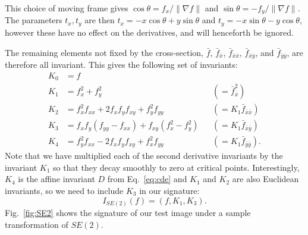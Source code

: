 \documentclass{artjlt}
\begin{document}
This choice of moving frame gives $\cos\theta = f_x/\lVert\nabla f\rVert$
and $\sin\theta = -f_y/\lVert \nabla f \rVert$. The parameters $t_x, t_y$
are then $t_x = -x\cos\theta + y\sin\theta$ and $t_y = -x\sin\theta -
y\cos\theta$, however these have no effect on the derivatives, and will
henceforth be ignored.

The remaining elements not fixed by the cross-section, $\bar{f}$,
$\bar{f}_{\bar{x}}$, $\bar{f}_{\bar{x}\bar{x}}$,
$\bar{f}_{\bar{x}\bar{y}}$, and $\bar{f}_{\bar{y}\bar{y}}$, are therefore
all invariant. This gives the following set of invariants:
\begin{equation}\label{eq:se2invariants}
\begin{aligned}
  K_0 &= f \\
  K_1 &= f_x^2 + f_y^2 & &(= \bar{f}_{\bar{x}}^2)\\
  K_2 &= f_x^2 f_{xx} + 2 f_x f_y f_{xy} + f_y^2 f_{yy} &&(= K_1\bar{f}_{\bar{x}\bar{x}}) \\
  K_3 &= f_x f_y (f_{yy} - f_{xx}) + f_{xy} (f_x^2 - f_y^2) &&(= K_1\bar{f}_{\bar{x}\bar{y}})\\
  K_4 &= f_y^2 f_{xx} - 2 f_x f_y f_{xy} + f_x^2 f_{yy} &&(= K_1\bar{f}_{\bar{y}\bar{y}}).
\end{aligned}
\end{equation}
Note that we have multiplied each of the second derivative invariants by the
invariant $K_1$ so that they decay smoothly to zero at critical
points.  Interestingly, $K_4$ is the affine invariant $D$ from
Eq.~\eqref{eq:cde} and $K_1$ and $K_2$ are also Euclidean invariants, so we need to
include $K_3$ in our signature: 
\begin{equation}
    \label{eq:SE2signature}
    I_{SE(2)}(f) = (f, K_1, K_3).
\end{equation}
Fig.~\ref{fig:SE2} shows the signature of our test image under a sample
transformation of $SE(2)$.
\end{document}
